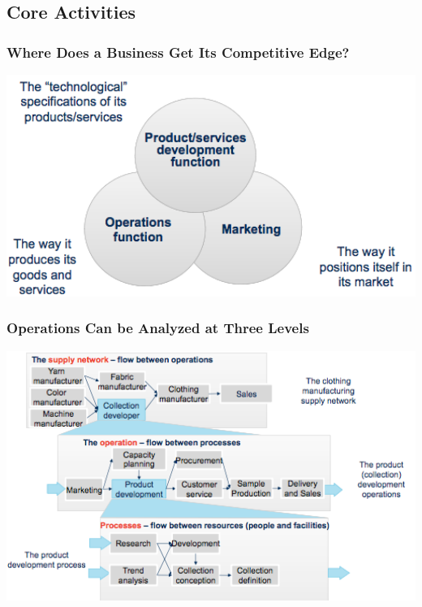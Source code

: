 \subsection{Core Activities}
\subsubsection{Where Does a Business Get Its Competitive Edge?}
\includegraphics[width=1\textwidth]{W01/competitive_edge}
\subsubsection{Operations Can be Analyzed at Three Levels}
\includegraphics[width=1\textwidth]{W01/operations_three_levels}
